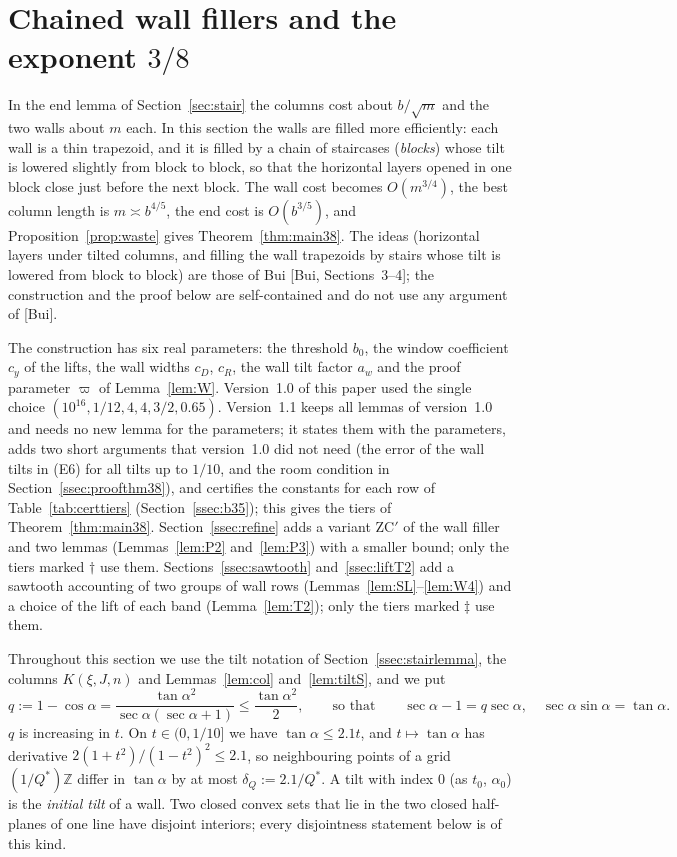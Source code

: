 \documentclass[11pt]{amsart}
\newcommand{\Z}{\mathbb Z}
\newcommand{\ca}{\cos\alpha}
\newcommand{\sa}{\sin\alpha}
\newcommand{\ta}{\tan\alpha}
\newcommand{\se}{\sec\alpha}
\theoremstyle{definition}
\theoremstyle{remark}
\numberwithin{equation}{section}
\begin{document}
\section{Chained wall fillers and the exponent \texorpdfstring{$3/8$}{3/8}}\label{sec:38}

In the end lemma of Section~\ref{sec:stair} the columns cost about $b/\sqrt m$ and the two walls about $m$ each. In this
section the walls are filled more efficiently: each wall is a thin trapezoid, and it is filled by a chain of
staircases (\emph{blocks}) whose tilt is lowered slightly from block to block, so that the horizontal layers opened in
one block close just before the next block. The wall cost becomes $O(m^{3/4})$, the best column length is
$m\asymp b^{4/5}$, the end cost is $O(b^{3/5})$, and Proposition~\ref{prop:waste} gives Theorem~\ref{thm:main38}. The
ideas (horizontal layers under tilted columns, and filling the wall trapezoids by stairs whose tilt is lowered from
block to block) are those of Bui [Bui, Sections~3--4]; the construction and the proof below are self-contained and do not
use any argument of [Bui].

The construction has six real parameters: the threshold $b_0$, the window coefficient $c_y$ of the lifts, the wall
widths $c_D$, $c_R$, the wall tilt factor $a_w$ and the proof parameter $\varpi$ of Lemma~\ref{lem:W}. Version~1.0 of
this paper used the single choice $(10^{16},1/12,4,4,3/2,0.65)$. Version~1.1 keeps all lemmas of version~1.0 and needs
no new lemma for the parameters; it states them with the parameters, adds two short arguments that version~1.0 did not
need (the error of the wall tilts in (E6) for all tilts up to $1/10$, and the room condition in
Section~\ref{ssec:proofthm38}), and certifies the constants for each row of
Table~\ref{tab:certtiers} (Section~\ref{ssec:b35}); this gives the tiers of Theorem~\ref{thm:main38}.
Section~\ref{ssec:refine} adds a variant ZC$'$ of the wall filler and two lemmas (Lemmas~\ref{lem:P2}
and~\ref{lem:P3}) with a smaller bound; only the tiers marked $\dagger$ use them.
Sections~\ref{ssec:sawtooth} and~\ref{ssec:liftT2} add a sawtooth accounting of two groups of wall rows
(Lemmas~\ref{lem:SL}--\ref{lem:W4}) and a choice of the lift of each band (Lemma~\ref{lem:T2}); only the tiers marked
$\ddagger$ use them.

Throughout this section we use the tilt notation of Section~\ref{ssec:stairlemma}, the columns $K(\xi,J,n)$ and
Lemmas~\ref{lem:col} and~\ref{lem:tiltS}, and we put
\[
q:=1-\ca=\frac{\ta^2}{\se(\se+1)}\le\frac{\ta^2}2,\qquad\text{so that}\qquad \se-1=q\se,\quad \se\sa=\ta .
\]
$q$ is increasing in $t$. On $t\in(0,1/10]$ we have $\ta\le2.1t$, and $t\mapsto\ta$ has derivative
$2(1+t^2)/(1-t^2)^2\le2.1$, so neighbouring points of a grid $(1/Q^*)\Z$ differ in $\ta$ by at most
$\delta_Q:=2.1/Q^*$. A tilt with index $0$ (as $t_0$, $\alpha_0$) is the \emph{initial tilt} of a wall. Two closed convex
sets that lie in the two closed half-planes of one line have disjoint interiors; every disjointness statement below is
of this kind.
\end{document}
